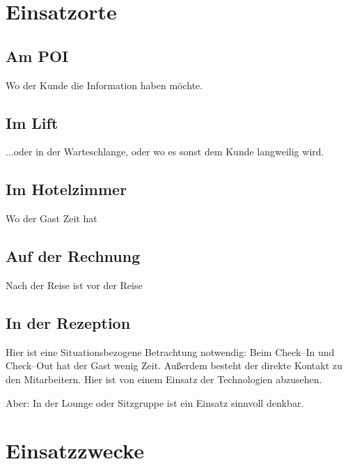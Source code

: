 
\section{Einsatzorte} %
\label{sec:einsatzorte}

\subsection{Am POI} %
\label{sub:am_poi}
Wo der Kunde die Information haben möchte.

\subsection{Im Lift} %
\label{sub:im_lift}
...oder in der Warteschlange, oder wo es sonst dem Kunde langweilig wird.

\subsection{Im Hotelzimmer} %
\label{sub:im_hotelzimmer}
Wo der Gast Zeit hat

\subsection{Auf der Rechnung} %
\label{sub:auf_der_rechnung}
Nach der Reise ist vor der Reise

\subsection{In der Rezeption} %
\label{sub:in_der_rezeption}
Hier ist eine Situationsbezogene Betrachtung notwendig: Beim Check--In und Check--Out hat der Gast wenig Zeit. Außerdem besteht der direkte Kontakt zu den Mitarbeitern. Hier ist von einem Einsatz der Technologien abzusehen.

Aber: In der Lounge oder Sitzgruppe ist ein Einsatz sinnvoll denkbar.


\newpage
\section{Einsatzzwecke} %
\label{sec:einsatzzwecke}

